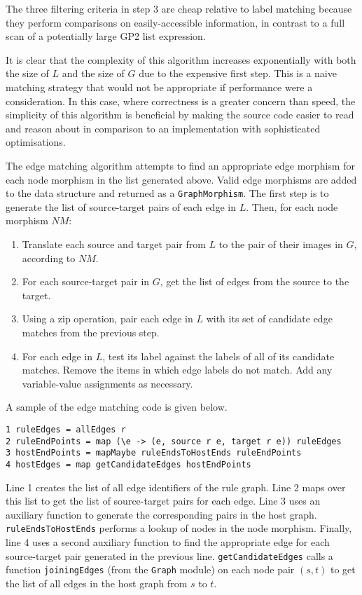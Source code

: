 The three filtering criteria in step 3 are cheap relative to label matching because they perform comparisons on easily-accessible information, in contrast to a full scan of a potentially large GP2 list expression.

It is clear that the complexity of this algorithm increases exponentially with both the size of $L$ and the size of $G$ due to the expensive first step. This is a naive matching strategy that would not be appropriate if performance were a consideration. In this case, where correctness is a greater concern than speed, the simplicity of this algorithm is beneficial by making the source code easier to read and reason about in comparison to an implementation with sophisticated optimisations.

The edge matching algorithm attempts to find an appropriate edge morphism for each node morphism in the list generated above. Valid edge morphisms are added to the data structure and returned as a \texttt{GraphMorphism}. The first step is to generate the list of source-target pairs of each edge in $L$. Then, for each node morphism $NM$:

\begin{enumerate}
\item Translate each source and target pair from $L$ to the pair of their images in $G$, according to $NM$.
\item For each source-target pair in $G$, get the list of edges from the source to the target.
\item Using a zip operation, pair each edge in $L$ with its set of candidate edge matches from the previous step.
\item For each edge in $L$, test its label against the labels of all of its candidate matches. Remove the items in which edge labels do not match. Add any variable-value assignments as necessary.
\end{enumerate}

A sample of the edge matching code is given below.

\begin{verbatim}
1 ruleEdges = allEdges r
2 ruleEndPoints = map (\e -> (e, source r e, target r e)) ruleEdges
3 hostEndPoints = mapMaybe ruleEndsToHostEnds ruleEndPoints
4 hostEdges = map getCandidateEdges hostEndPoints
\end{verbatim}

Line 1 creates the list of all edge identifiers of the rule graph. Line 2 maps over this list to get the list of source-target pairs for each edge. Line 3 uses an auxiliary function to generate the corresponding pairs in the host graph. \texttt{ruleEndsToHostEnds} performs a lookup of nodes in the node morphism. Finally, line 4 uses a second auxiliary function to find the appropriate edge for each source-target pair generated in the previous line. \texttt{getCandidateEdges} calls a function \texttt{joiningEdges} (from the \texttt{Graph} module) on each node pair $(s,t)$ to get the list of all edges in the host graph from $s$ to $t$. 

